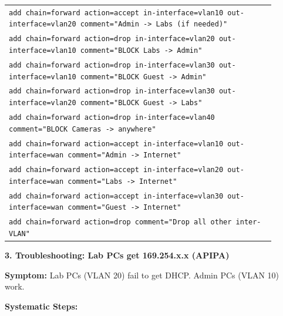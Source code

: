 \documentclass[11pt]{article}
\begin{document}
\begin{exoresolu}
\begin{center}
\begin{tabular}{|p{0.9\linewidth}|}
\texttt{add chain=forward action=accept in-interface=vlan10 out-interface=vlan20 comment="Admin -> Labs (if needed)"}\\
\texttt{add chain=forward action=drop in-interface=vlan20 out-interface=vlan10 comment="BLOCK Labs -> Admin"}\\
\texttt{add chain=forward action=drop in-interface=vlan30 out-interface=vlan10 comment="BLOCK Guest -> Admin"}\\
\texttt{add chain=forward action=drop in-interface=vlan30 out-interface=vlan20 comment="BLOCK Guest -> Labs"}\\
\texttt{add chain=forward action=drop in-interface=vlan40 comment="BLOCK Cameras -> anywhere"}\\
\texttt{add chain=forward action=accept in-interface=vlan10 out-interface=wan comment="Admin -> Internet"}\\
\texttt{add chain=forward action=accept in-interface=vlan20 out-interface=wan comment="Labs -> Internet"}\\
\texttt{add chain=forward action=accept in-interface=vlan30 out-interface=wan comment="Guest -> Internet"}\\
\texttt{add chain=forward action=drop comment="Drop all other inter-VLAN"}\\\hline
\end{tabular}
\end{center}

\textbf{3. Troubleshooting: Lab PCs get 169.254.x.x (APIPA)}

\textbf{Symptom:} Lab PCs (VLAN 20) fail to get DHCP. Admin PCs (VLAN 10) work.

\textbf{Systematic Steps:}


\end{exoresolu}
\end{document}
